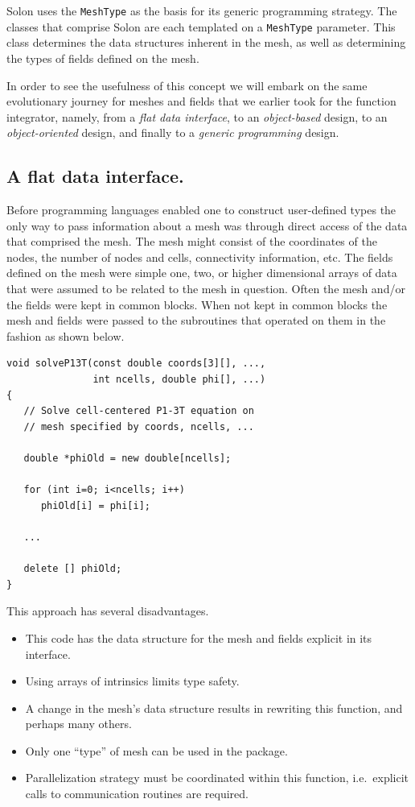 \documentclass[reqno]{lanl}
\begin{document}
Solon uses the \texttt{MeshType} as the basis for its generic programming
strategy.
The classes that comprise Solon are each templated on a \texttt{MeshType}
parameter.
This class determines the data structures inherent in the mesh, as
well as determining the types of fields defined on the mesh.

In order to see the usefulness of this concept we will embark on the same
evolutionary journey for meshes and fields that we earlier took for the
function integrator, namely, from a \emph{flat data interface}, to
an \emph{object-based} design, to an \emph{object-oriented}
design, and finally to a \emph{generic programming} design.

\subsection{A flat data interface.}
Before programming languages enabled one to construct user-defined types
the only way to pass information about a mesh
was through direct access of the data that comprised the mesh.
The mesh might consist of the coordinates of the nodes,
the number of nodes and cells,
connectivity information, etc.
The fields defined on the mesh were simple one, two, or higher dimensional
arrays of data that were assumed to be related to the mesh in question.
Often the mesh and/or the fields were kept in common blocks.
When not kept in common blocks the mesh and fields were passed to the
subroutines that operated on them in the fashion as shown below.
%
 \begin{verbatim}
void solveP13T(const double coords[3][], ...,
               int ncells, double phi[], ...)
{
   // Solve cell-centered P1-3T equation on
   // mesh specified by coords, ncells, ...

   double *phiOld = new double[ncells];

   for (int i=0; i<ncells; i++)
      phiOld[i] = phi[i];

   ...

   delete [] phiOld;
}
\end{verbatim} \normalcolor

This approach has several disadvantages.
\begin{itemize}
\item This code has the data structure for the mesh and fields explicit in
  its interface.
\item Using arrays of intrinsics limits type safety.
\item A change in the mesh's data structure results in rewriting this
  function, and perhaps many others.
\item Only one ``type'' of mesh can be used in the package.
\item Parallelization strategy must be coordinated within this function,
  i.e.\ explicit calls to communication routines are required.
\end{itemize}
\end{document}
